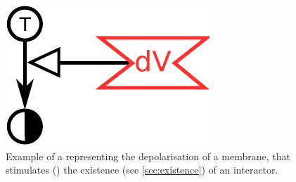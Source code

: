 \begin{figure}[H]
  \centering
  \includegraphics[scale = 0.5]{examples/ex-perturbing}
  \caption{Example of a  representing the depolarisation of a membrane, that stimulates () the existence (see \ref{sec:existence}) of an interactor.}
  \label{fig:ex-perturbing}
\end{figure}

\normalcolor

